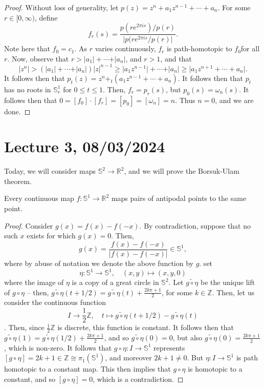 \documentclass[a4paper]{report}
\theoremstyle{definition}
\theoremstyle{remark}
\theoremstyle{proposition}
\theoremstyle{conjecture}
\theoremstyle{lemma}
\theoremstyle{corollary}
\theoremstyle{exercise}
\begin{document}
\begin{proof}
    Without loss of generality, let $p(z) = z^n + a_1 z^{n-1} + \cdots + a_n$.
    For some $r \in [0,\infty)$, define 
    $$f_r(s) = \frac{p(re^{2\pi is})/p(r)}{\vert p(re^{2\pi is}/p(r)\vert}.$$
    Note here that $f_0 = c_1$. As $r$ varies continuously, $f_r$ is path-homotopic to $f_0$for all $r$.  Now, observe that $r > \vert a_1 \vert + \cdots + \vert a_n\vert$, and $r > 1$, and that $$\vert z^n \vert > (\vert a_1\vert + \cdots + \vert a_n \vert) \vert z \vert^{n-1} \geq \vert a_1 z^{n-1}\vert + \cdots + \vert a_n\vert \geq \vert a_1 z^{n+1} + \cdots + a_n\vert.$$
    It follows then that $p_t(z) = z^n +_ t (a_1z^{n-1} + \cdots + a_n)$. It follows then that 
    $p_t$ has no roots in $\mathbb{S}^1_r$ for $0\leq t \leq 1$.
    Then, $f_r = p_r(s)$, but $p_0(s) = \omega_n(s)$. It follows then that $0 = [f_0] \cdot [f_r] = [p_0] = [\omega_n] = n$.
    Thus $n=0$, and we are done.
\end{proof}

\section{Lecture 3, 08/03/2024}

Today, we will consider maps $\mathbb{S}^2 \to \mathbb{R}^2$, and we will
prove the Borsuk-Ulam theorem. 

\begin{theorem}
    Every continuous map $f : \mathbb{S}^1 \to \mathbb{R}^2$ maps
    pairs of antipodal points to the same point.
\end{theorem}

\begin{proof}
    Consider $g(x) = f(x) - f(-x)$. By contradiction, suppose that no such 
    $x$ exists for which $g(x) = 0$. 
    Then, $$g(x) = \frac{f(x)-f(-x)}{\vert f(x) - f(-x)\vert} \in \mathbb{S}^1,$$
    where by abuse of notation we denote the above function by $g$.
    set 
    $$\eta : \mathbb{S}^1 \to \mathbb{S}^1, \quad (x,y) \longmapsto (x,y,0)$$
    where the image of $\eta$ is a copy of a great circle in 
    $\mathbb{S}^2$. 
    Let $\widetilde{g\circ \eta}$ be the unique lift of $g\circ \eta$ -- 
    then, $\widetilde{g\circ \eta} (t + 1/2) = \widetilde{g\circ \eta}(t) + \frac{2k\pi + 1}{2}$, for some $k \in \mathbb{Z}$.
    Then, let us consider the continuous function 
    $$I \longrightarrow \frac{1}{2}\mathbb{Z},\quad t\mapsto \widetilde{g\circ \eta}(t + 1/2) - \widetilde{g\circ \eta}(t)$$.
    Then, since $\frac{1}{2}\mathbb{Z}$ is discrete, this function is constant.
    It follows then that $\widetilde{g\circ \eta}(1) = \widetilde{g\circ \eta}(1/2) + \frac{2k\pi + 1}{2}$, and so 
    $\widetilde{g\circ \eta}(0) = 0$, but 
    also $\widetilde{g\circ \eta}(0) = \frac{2k\pi + 1}{2}$, which is non-zero.
    It follows that 
    $g\circ \eta : I \to \mathbb{S}^1$ represents $[g\circ \eta] = 2k + 1\in \mathbb{Z} \cong \pi_1(\mathbb{S}^1)$, and moreover $2k+1 \neq 0$.
    But $\eta : I \to \mathbb{S}^1$ is path homotopic to a constant map.
    This then implies that $g\circ \eta$ is homotopic to a constant,
    and so $[g\circ \eta] = 0$, which is a contradiction.
\end{proof}
\end{document}
